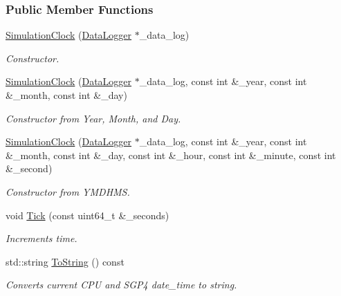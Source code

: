 \subsubsection*{Public Member Functions}
\begin{DoxyCompactItemize}
\item 
\hyperlink{classosse_1_1collaborate_1_1_simulation_clock_a538621acdc4673f7463f2fa16622f7b9}{Simulation\+Clock} (\hyperlink{classosse_1_1collaborate_1_1_data_logger}{Data\+Logger} $\ast$\+\_\+data\+\_\+log)
\begin{DoxyCompactList}\small\item\em Constructor. \end{DoxyCompactList}\item 
\hyperlink{classosse_1_1collaborate_1_1_simulation_clock_a19b6f432a5f9320650dcb047183ac09d}{Simulation\+Clock} (\hyperlink{classosse_1_1collaborate_1_1_data_logger}{Data\+Logger} $\ast$\+\_\+data\+\_\+log, const int \&\+\_\+year, const int \&\+\_\+month, const int \&\+\_\+day)
\begin{DoxyCompactList}\small\item\em Constructor from Year, Month, and Day. \end{DoxyCompactList}\item 
\hyperlink{classosse_1_1collaborate_1_1_simulation_clock_a8239ac64397b72466ec46b5785111269}{Simulation\+Clock} (\hyperlink{classosse_1_1collaborate_1_1_data_logger}{Data\+Logger} $\ast$\+\_\+data\+\_\+log, const int \&\+\_\+year, const int \&\+\_\+month, const int \&\+\_\+day, const int \&\+\_\+hour, const int \&\+\_\+minute, const int \&\+\_\+second)
\begin{DoxyCompactList}\small\item\em Constructor from Y\+M\+D\+H\+MS. \end{DoxyCompactList}\item 
void \hyperlink{classosse_1_1collaborate_1_1_simulation_clock_aabf56af06948df891086681c1651cbfe}{Tick} (const uint64\+\_\+t \&\+\_\+seconds)
\begin{DoxyCompactList}\small\item\em Increments time. \end{DoxyCompactList}\item 
std\+::string \hyperlink{classosse_1_1collaborate_1_1_simulation_clock_a10001235cd019861c226e6d8814da638}{To\+String} () const
\begin{DoxyCompactList}\small\item\em Converts current C\+PU and S\+G\+P4 date\+\_\+time to string. \end{DoxyCompactList}\item 

\end{DoxyCompactItemize}

